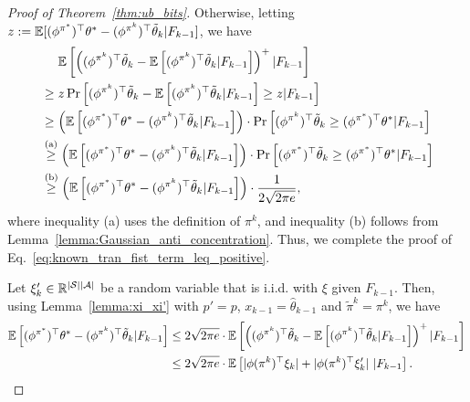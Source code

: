 \begin{proof}[Proof of Theorem~\ref{thm:ub_bits}]
	Otherwise, letting $z:= \mathbb{E}[ (\phi^{\pi^*})^\top \theta^* - (\phi^{\pi^k})^\top \tilde{\theta}_k | F_{k-1} ]$, we have
	\begin{align*}
		&\quad\ \mathbb{E}\left[  \left(  (\phi^{\pi^k})^\top \tilde{\theta}_k  - \mathbb{E}\left[  (\phi^{\pi^k})^\top \tilde{\theta}_k  | F_{k-1}  \right]  \right)^{+} | F_{k-1}  \right]
		\\
		&\geq z \Pr\left[   (\phi^{\pi^k})^\top \tilde{\theta}_k  - \mathbb{E}\left[  (\phi^{\pi^k})^\top \tilde{\theta}_k   | F_{k-1}  \right] \geq z | F_{k-1}  \right]
		\\
		&\geq \left( \mathbb{E}\left[  (\phi^{\pi^*})^\top \theta^* - (\phi^{\pi^k})^\top \tilde{\theta}_k | F_{k-1}  \right]  \right) \cdot \Pr\left[   (\phi^{\pi^k})^\top \tilde{\theta}_k   \geq (\phi^{\pi^*})^\top \theta^* | F_{k-1}  \right]
		\\
		&\overset{\textup{(a)}}{\geq} \left( \mathbb{E}\left[  (\phi^{\pi^*})^\top \theta^* - (\phi^{\pi^k})^\top \tilde{\theta}_k | F_{k-1}  \right]  \right) \cdot \Pr\left[   (\phi^{\pi^*})^\top \tilde{\theta}_k   \geq (\phi^{\pi^*})^\top \theta^* | F_{k-1}  \right]
		\\
		&\overset{\textup{(b)}}{\geq} \left( \mathbb{E}\left[  (\phi^{\pi^*})^\top \theta^* - (\phi^{\pi^k})^\top \tilde{\theta}_k | F_{k-1}  \right]  \right) \cdot \frac{1}{2\sqrt{2\pi e}} ,
	\end{align*}
	where inequality (a) uses the definition of $\pi^k$, and inequality (b) follows from Lemma~\ref{lemma:Gaussian_anti_concentration}. Thus, we complete the proof of Eq.~\eqref{eq:known_tran_fist_term_leq_positive}.
	
	Let $\xi'_k \in \mathbb{R}^{|\mathcal{S}||\mathcal{A}|}$ be a random variable that is i.i.d. with $\xi$ given $F_{k-1}$.
	Then, using Lemma~\ref{lemma:xi_xi'} with $p'=p$, $x_{k-1}=\hat{\theta}_{k-1}$ and $\tilde{\pi}^k=\pi^k$, we have
	\begin{align*}
		\mathbb{E}\left[  (\phi^{\pi^*})^\top \theta^* - (\phi^{\pi^k})^\top \tilde{\theta}_k | F_{k-1}  \right] &\leq 2\sqrt{2\pi e} \cdot \mathbb{E}\left[  \left(  (\phi^{\pi^k})^\top \tilde{\theta}_k  - \mathbb{E}\left[  (\phi^{\pi^k})^\top \tilde{\theta}_k  | F_{k-1}  \right]  \right)^{+} | F_{k-1}  \right] 
		\\
		&\leq 2\sqrt{2\pi e} \cdot \mathbb{E}\left[  | \phi(\pi^k)^\top \xi_k | + | \phi(\pi^k)^\top \xi'_k| \ | F_{k-1}  \right] .
	\end{align*}
	

\end{proof}
